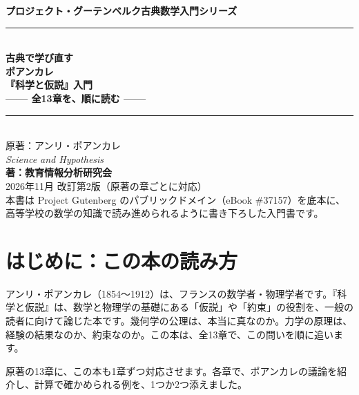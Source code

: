 \documentclass[a4paper,11pt,openany]{ltjsbook}
\begin{document}
\begin{titlepage}
\begin{center}
\vspace*{1.5cm}
{\Large\bfseries プロジェクト・グーテンベルク古典数学入門シリーズ}\\[0.8cm]
\rule{\textwidth}{1.5pt}\\[0.4cm]
{\Huge\bfseries 古典で学び直す\\ポアンカレ\\『科学と仮説』入門}\\[0.4cm]
{\Large\bfseries —— 全13章を、順に読む ——}\\[0.4cm]
\rule{\textwidth}{1.5pt}\\[1.5cm]
{\large 原著：アンリ・ポアンカレ\\
\textit{Science and Hypothesis}}\\[2.0cm]
{\Large\bfseries 著：教育情報分析研究会}\\[2.5cm]
\vfill
{\large 2026年11月 改訂第2版（原著の章ごとに対応）}\\[0.5cm]
{\footnotesize 本書は Project Gutenberg のパブリックドメイン（eBook \#37157）を底本に、\\
高等学校の数学の知識で読み進められるように書き下ろした入門書です。}
\end{center}
\end{titlepage}

\frontmatter
\tableofcontents
\mainmatter

\chapter*{はじめに：この本の読み方}

アンリ・ポアンカレ（1854〜1912）は、フランスの数学者・物理学者です。『科学と仮説』は、数学と物理学の基礎にある「仮説」や「約束」の役割を、一般の読者に向けて論じた本です。幾何学の公理は、本当に真なのか。力学の原理は、経験の結果なのか、約束なのか。この本は、全13章で、この問いを順に追います。

原著の13章に、この本も1章ずつ対応させます。各章で、ポアンカレの議論を紹介し、計算で確かめられる例を、1つか2つ添えました。
\end{document}

